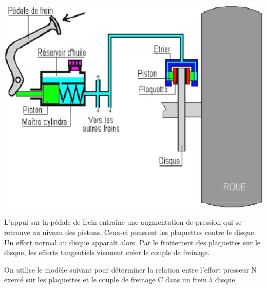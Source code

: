 \documentclass[10pt]{article}
\begin{document}
\begin{minipage}[c]{.4\linewidth}
\begin{center}
\includegraphics[width=.95\textwidth]{images/frein2}
\end{center}
\end{minipage} \hfill
\begin{minipage}[c]{.57\linewidth}
L'appui sur la pédale de frein entraîne une augmentation de pression qui se retrouve au niveau des pistons. Ceux-ci poussent les plaquettes contre le disque. Un effort normal au disque apparaît alors. Par le frottement des plaquettes sur le disque, les efforts tangentiels viennent créer le couple de freinage. 

On utilise le modèle suivant pour déterminer la relation entre l'effort presseur N exercé sur les plaquettes et le couple de freinage C dans un frein à disque. 
\end{minipage}
\end{document}
